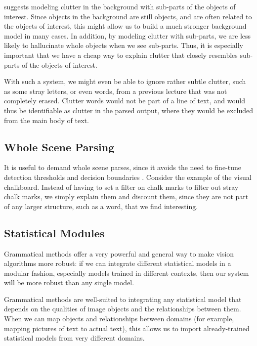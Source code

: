 \cite{jin-geman} suggests modeling clutter in the background with
sub-parts of the objects of interest. Since objects in the background
are still objects, and are often related to the objects of interest,
this might allow us to build a much stronger background model in many
cases. In addition, by modeling clutter with sub-parts, we are less
likely to hallucinate whole objects when we see sub-parts. Thus, it is
especially important that we have a cheap way to explain clutter that
closely resembles sub-parts of the objects of interest.

With such a system, we might even be able to ignore rather subtle
clutter, such as some stray letters, or even words, from a previous
lecture that was not completely erased. Clutter words would not be
part of a line of text, and would thus be identifiable as clutter in
the parsed output, where they would be excluded from the main body of
text.

\subsection{Whole Scene Parsing}
\label{sec-whole}

It is useful to demand whole scene parses, since it avoids the need to
fine-tune detection thresholds and decision boundaries
\cite{pop}. Consider the example of the visual chalkboard. Instead of
having to set a filter on chalk marks to filter out stray chalk marks,
we simply explain them and discount them, since they are not part of
any larger structure, such as a word, that we find interesting.

\subsection{Statistical Modules}
\label{sec-modules}

Grammatical methods offer a very powerful and general way to make
vision algorithms more robust: if we can integrate different
statistical models in a modular fashion, especially models trained in
different contexts, then our system will be more robust than any
single model.

Grammatical methods are well-suited to integrating any statistical
model that depends on the qualities of image objects and the
relationships between them. When we can map objects and relationships
between domains (for example, mapping pictures of text to actual
text), this allows us to import already-trained statistical models
from very different domains.

